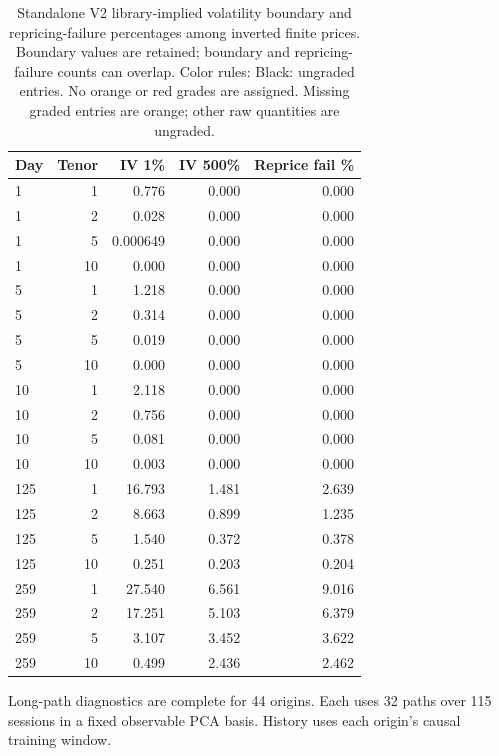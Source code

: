 \documentclass[11pt]{article}
\begin{document}
\begin{table}[H]\centering\small\setlength{\tabcolsep}{4pt}
\caption{Standalone V2 library-implied volatility boundary and repricing-failure percentages among inverted finite prices. Boundary values are retained; boundary and repricing-failure counts can overlap. Color rules: Black: ungraded entries. No orange or red grades are assigned. Missing graded entries are orange; other raw quantities are ungraded.}\label{tab:standalone-v2-iv}
\begin{tabular}{@{}lrrrr@{}}
\toprule
Day & Tenor & IV 1\% & IV 500\% & Reprice fail \% \\
\midrule
1 & 1 & 0.776 & 0.000 & 0.000 \\
1 & 2 & 0.028 & 0.000 & 0.000 \\
1 & 5 & 0.000649 & 0.000 & 0.000 \\
1 & 10 & 0.000 & 0.000 & 0.000 \\
5 & 1 & 1.218 & 0.000 & 0.000 \\
5 & 2 & 0.314 & 0.000 & 0.000 \\
5 & 5 & 0.019 & 0.000 & 0.000 \\
5 & 10 & 0.000 & 0.000 & 0.000 \\
10 & 1 & 2.118 & 0.000 & 0.000 \\
10 & 2 & 0.756 & 0.000 & 0.000 \\
10 & 5 & 0.081 & 0.000 & 0.000 \\
10 & 10 & 0.003 & 0.000 & 0.000 \\
125 & 1 & 16.793 & 1.481 & 2.639 \\
125 & 2 & 8.663 & 0.899 & 1.235 \\
125 & 5 & 1.540 & 0.372 & 0.378 \\
125 & 10 & 0.251 & 0.203 & 0.204 \\
259 & 1 & 27.540 & 6.561 & 9.016 \\
259 & 2 & 17.251 & 5.103 & 6.379 \\
259 & 5 & 3.107 & 3.452 & 3.622 \\
259 & 10 & 0.499 & 2.436 & 2.462 \\
\bottomrule\end{tabular}\end{table}

Long-path diagnostics are complete for 44 origins. Each uses 32 paths over 115 sessions in a fixed observable PCA basis. History uses each origin's causal training window.
\end{document}
